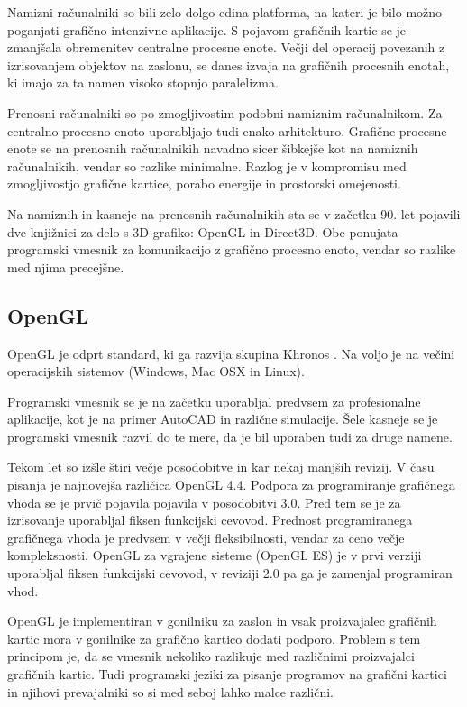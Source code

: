Namizni računalniki so bili zelo dolgo edina platforma, na kateri je bilo možno poganjati grafično intenzivne aplikacije. S pojavom grafičnih kartic se je zmanjšala obremenitev centralne procesne enote. Večji del operacij povezanih z izrisovanjem objektov na zaslonu, se danes izvaja na grafičnih procesnih enotah, ki imajo za ta namen visoko stopnjo paralelizma. 

Prenosni računalniki so po zmogljivostim podobni namiznim računalnikom. Za centralno procesno enoto uporabljajo tudi enako arhitekturo. Grafične procesne enote se na prenosnih računalnikih navadno sicer šibkejše kot na namiznih računalnikih, vendar so razlike minimalne. Razlog je v kompromisu med zmogljivostjo grafične kartice, porabo energije in prostorski omejenosti.

Na namiznih in kasneje na prenosnih računalnikih sta se v začetku 90. let pojavili dve knjižnici za delo s 3D grafiko: OpenGL in Direct3D. Obe ponujata programski vmesnik za komunikacijo z grafično procesno enoto, vendar so razlike med njima precejšne.


\subsection{OpenGL}

OpenGL je odprt standard, ki ga razvija skupina Khronos \cite{opengl}. Na voljo je na večini operacijskih sistemov (Windows, Mac OSX in Linux).

Programski vmesnik se je na začetku uporabljal predvsem za profesionalne aplikacije, kot je na primer AutoCAD in različne simulacije. Šele kasneje se je programski vmesnik razvil do te mere, da je bil uporaben tudi za druge namene.

Tekom let so izšle štiri večje posodobitve in kar nekaj manjših revizij. V času pisanja je najnovejša različica OpenGL 4.4. Podpora za programiranje grafičnega vhoda se je prvič pojavila pojavila v posodobitvi 3.0. Pred tem se je za izrisovanje uporabljal fiksen funkcijski cevovod. Prednost programiranega grafičnega vhoda je predvsem v večji fleksibilnosti, vendar za ceno večje kompleksnosti. OpenGL za vgrajene sisteme (OpenGL ES) je v prvi verziji uporabljal fiksen funkcijski cevovod, v reviziji 2.0 pa ga je zamenjal programiran vhod. 

OpenGL je implementiran v gonilniku za zaslon in vsak proizvajalec grafičnih kartic mora v gonilnike za grafično kartico dodati podporo. Problem s tem principom je, da se vmesnik nekoliko razlikuje med različnimi proizvajalci grafičnih kartic. Tudi programski jeziki za pisanje programov na grafični kartici in njihovi prevajalniki so si med seboj lahko malce različni.


